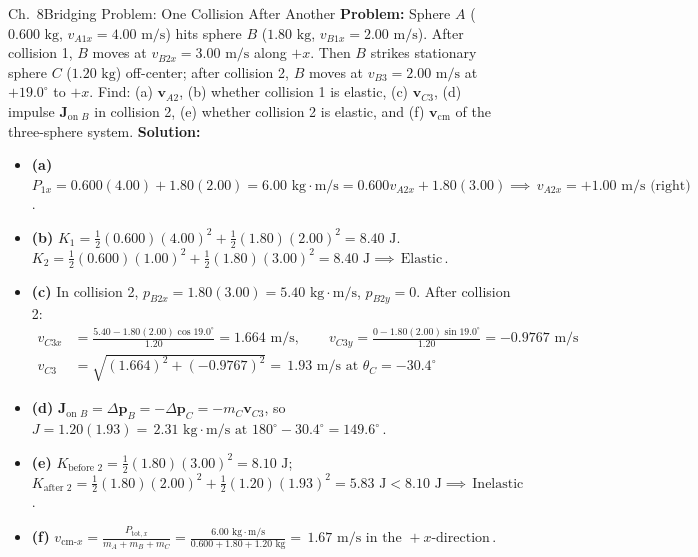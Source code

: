 \documentclass[11pt,a4paper,openany,oneside]{book}
\newcommand{\eqbox}[1]{\boxed{\,#1\,}}
\newcommand{\vect}[1]{\mathbf{#1}}
\numberwithin{equation}{chapter}
\newcommand{\bk}[1]{\texorpdfstring{\enspace{\normalfont\small\color{slate}[Book #1]}}{ [Book #1]}}
\begin{document}
\begin{example}{Ch.\ 8}{Bridging Problem: One Collision After Another\bk{p.\ 267, 277}}
\textbf{Problem:} Sphere $A$ ($0.600\text{ kg}$, $v_{A1x} = 4.00\text{ m/s}$) hits sphere $B$ ($1.80\text{ kg}$, $v_{B1x} = 2.00\text{ m/s}$). After collision 1, $B$ moves at $v_{B2x} = 3.00\text{ m/s}$ along $+x$. Then $B$ strikes stationary sphere $C$ ($1.20\text{ kg}$) off-center; after collision 2, $B$ moves at $v_{B3} = 2.00\text{ m/s}$ at $+19.0^\circ$ to $+x$. Find: (a) $\vect{v}_{A2}$, (b) whether collision 1 is elastic, (c) $\vect{v}_{C3}$, (d) impulse $\vect{J}_{\text{on }B}$ in collision 2, (e) whether collision 2 is elastic, and (f) $\vect{v}_{\text{cm}}$ of the three-sphere system.
\tcblower
\textbf{Solution:}
\begin{itemize}
  \item \textbf{(a)} $P_{1x} = 0.600(4.00) + 1.80(2.00) = 6.00\text{ kg}\cdot\text{m/s} = 0.600v_{A2x} + 1.80(3.00) \implies \eqbox{v_{A2x} = +1.00\text{ m/s}\text{ (right)}}$.
  \item \textbf{(b)} $K_1 = \frac{1}{2}(0.600)(4.00)^2 + \frac{1}{2}(1.80)(2.00)^2 = 8.40\text{ J}$. $K_2 = \frac{1}{2}(0.600)(1.00)^2 + \frac{1}{2}(1.80)(3.00)^2 = 8.40\text{ J} \implies \eqbox{\text{Elastic}}$.
  \item \textbf{(c)} In collision 2, $p_{B2x} = 1.80(3.00) = 5.40\text{ kg}\cdot\text{m/s}$, $p_{B2y} = 0$. After collision 2:
  \begin{align*}
    v_{C3x} &= \frac{5.40 - 1.80(2.00)\cos 19.0^\circ}{1.20} = 1.664\text{ m/s}, \qquad v_{C3y} = \frac{0 - 1.80(2.00)\sin 19.0^\circ}{1.20} = -0.9767\text{ m/s}\\
    v_{C3} &= \sqrt{(1.664)^2 + (-0.9767)^2} = \eqbox{1.93\text{ m/s}\text{ at }\theta_C = -30.4^\circ}
  \end{align*}
  \item \textbf{(d)} $\vect{J}_{\text{on }B} = \Delta\vect{p}_B = -\Delta\vect{p}_C = -m_C\vect{v}_{C3}$, so $J = 1.20(1.93) = \eqbox{2.31\text{ kg}\cdot\text{m/s}\text{ at }180^\circ - 30.4^\circ = 149.6^\circ}$.
  \item \textbf{(e)} $K_{\text{before 2}} = \frac{1}{2}(1.80)(3.00)^2 = 8.10\text{ J}$; $K_{\text{after 2}} = \frac{1}{2}(1.80)(2.00)^2 + \frac{1}{2}(1.20)(1.93)^2 = 5.83\text{ J} < 8.10\text{ J} \implies \eqbox{\text{Inelastic}}$.
  \item \textbf{(f)} $v_{\text{cm-}x} = \frac{P_{\text{tot},x}}{m_A+m_B+m_C} = \frac{6.00\text{ kg}\cdot\text{m/s}}{0.600+1.80+1.20\text{ kg}} = \eqbox{1.67\text{ m/s}\text{ in the }+x\text{-direction}}$.
\end{itemize}
\end{example}
\end{document}
